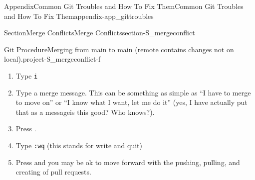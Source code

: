 \documentclass[twoside,10pt,]{book}
\newcommand{\mono}[1]{\texttt{#1}}
\newcommand{\kbd}[1]{\keys{{#1}}}
\begin{document}
\begin{appendixptx}{Appendix}{Common Git Troubles and How To Fix Them}{}{Common Git Troubles and How To Fix Them}{}{}{appendix-app_gittroubles}
\begin{sectionptx}{Section}{Merge Conflicts}{}{Merge Conflicts}{}{}{section-S_mergeconflict}
\begin{project}{Git Procedure}{Merging from main to main (remote contains changes not on local).}{project-S_mergeconflict-f}
\begin{enumerate}[font=\bfseries,label=(\alph*),ref=\alph*]%
\item{}Type \mono{i}%
\item{}Type a merge message. This can be something as simple as ``I have to merge to move on'' or ``I know what I want, let me do it'' (yes, I have actually put that as a message\textellipsis{}is this good? Who knows?).%
\item{}Press \kbd{esc}.%
\item{}Type \mono{:wq} (this stands for write and quit)%
\item{}Press \kbd{Enter} and you may be ok to move forward with the pushing, pulling, and creating of pull requests.%
\end{enumerate}%
\end{project}%
\end{sectionptx}
\end{appendixptx}
%
%
\typeout{************************************************}
\typeout{************************************************}
%
\end{document}
